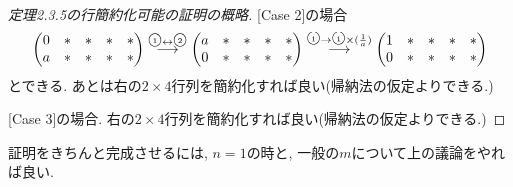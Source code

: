 \documentclass[dvipdfmx,a4paper,11pt]{article} %
\newcommand{\maru}[1]{\raise0.2ex\hbox{\textcircled{\tiny{#1}}}}
\theoremstyle{definition}
\begin{document}
\begin{proof}[定理2.3.5の行簡約化可能の証明の概略]
[Case 2]の場合
$$
\begin{pmatrix}
 0&  \ast&  \ast &  \ast& \ast\\
 a &  \ast&  \ast  &  \ast& \ast\\
 \end{pmatrix}
 \overset{\maru{1} \leftrightarrow  \maru{2}}{\longrightarrow}  
 \begin{pmatrix}
 a &  \ast&  \ast  &  \ast& \ast\\
 0&  \ast&  \ast &  \ast& \ast\\
 \end{pmatrix}
 \overset{\maru{1} \to \maru{1}\times(\frac{1}{a})}{\longrightarrow}  
   \begin{pmatrix}
 1&  \ast&  \ast &  \ast& \ast\\
0 &  \ast&  \ast  &  \ast& \ast\\
 \end{pmatrix}
$$
とできる. 
あとは右の$2 \times 4$行列を簡約化すれば良い(帰納法の仮定よりできる.)

[Case 3]の場合. 
右の$2 \times 4$行列を簡約化すれば良い(帰納法の仮定よりできる.)
\end{proof}
証明をきちんと完成させるには, $n=1$の時と, 一般の$m$について上の議論をやれば良い. 
\end{document}
